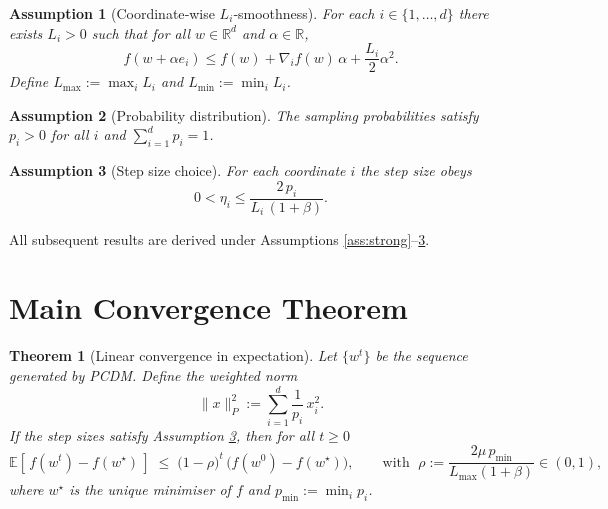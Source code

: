 \documentclass{article}
\newtheorem{theorem}{Theorem}
\newtheorem{assumption}{Assumption}
\newcommand{\E}{\mathbb{E}}
\newcommand{\R}{\mathbb{R}}
\begin{document}
\begin{assumption}[Coordinate‑wise $L_i$‑smoothness]\label{ass:smooth}
For each $i\in\{1,\dots,d\}$ there exists $L_i>0$ such that for all $w\in\R^{d}$ and $\alpha\in\R$,
\[
f(w+ \alpha e_i)\le f(w)+\nabla_i f(w)\,\alpha+\frac{L_i}{2}\alpha^{2}.
\]
Define $L_{\max}:=\max_i L_i$ and $L_{\min}:=\min_i L_i$.
\end{assumption}

\begin{assumption}[Probability distribution]\label{ass:prob}
The sampling probabilities satisfy $p_i>0$ for all $i$ and $\sum_{i=1}^{d}p_i=1$.
\end{assumption}

\begin{assumption}[Step size choice]\label{ass:stepsize}
For each coordinate $i$ the step size obeys
\[
0<\eta_i\le \frac{2\,p_i}{L_i\,(1+\beta)}.
\]
\end{assumption}

All subsequent results are derived under Assumptions \ref{ass:strong}–\ref{ass:stepsize}.

\section*{Main Convergence Theorem}
\begin{theorem}[Linear convergence in expectation]\label{thm:linear}
Let $\{w^{t}\}$ be the sequence generated by PCDM. Define the weighted norm
\[
\|x\|_{P}^{2}:=\sum_{i=1}^{d}\frac{1}{p_i}\,x_i^{2}.
\]
If the step sizes satisfy Assumption \ref{ass:stepsize}, then for all $t\ge 0$
\[
\E\!\left[\,f(w^{t})-f(w^{\star})\,\right]
\;\le\;
\bigl(1-\rho\bigr)^{t}\,\bigl(f(w^{0})-f(w^{\star})\bigr),
\qquad\text{with }\;
\rho:=\frac{2\mu\,p_{\min}}{L_{\max}(1+\beta)}\in(0,1),
\]
where $w^{\star}$ is the unique minimiser of $f$ and $p_{\min}:=\min_i p_i$.
\end{theorem}
\end{document}
